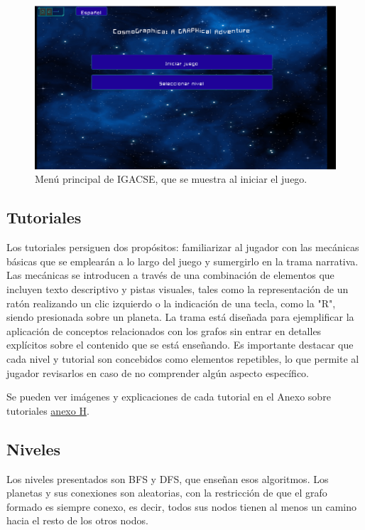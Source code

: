 \begin{figure}[h]
	\centering
	\includegraphics[scale=0.33]{imagenes/MainMenu.png}
	\caption{Menú principal de IGACSE, que se muestra al iniciar el juego.}
	\label{MenuPrincipal}
\end{figure}


\subsection{Tutoriales}

Los tutoriales persiguen dos propósitos: familiarizar al jugador con las mecánicas básicas que se emplearán a lo largo del juego y sumergirlo en la trama narrativa. Las mecánicas se introducen a través de una combinación de elementos que incluyen texto descriptivo y pistas visuales, tales como la representación de un ratón realizando un clic izquierdo o la indicación de una tecla, como la "R", siendo presionada sobre un planeta. La trama está diseñada para ejemplificar la aplicación de conceptos relacionados con los grafos sin entrar en detalles explícitos sobre el contenido que se está enseñando. Es importante destacar que cada nivel y tutorial son concebidos como elementos repetibles, lo que permite al jugador revisarlos en caso de no comprender algún aspecto específico.

Se pueden ver imágenes y explicaciones de cada tutorial en el Anexo sobre tutoriales \hyperref[AnexoHTutoriales]{anexo H}.

\subsection{Niveles}

Los niveles presentados son BFS y DFS, que enseñan esos algoritmos. Los planetas y sus conexiones son aleatorias, con la restricción de que el grafo formado es siempre conexo, es decir, todos sus nodos tienen al menos un camino hacia el resto de los otros nodos.

